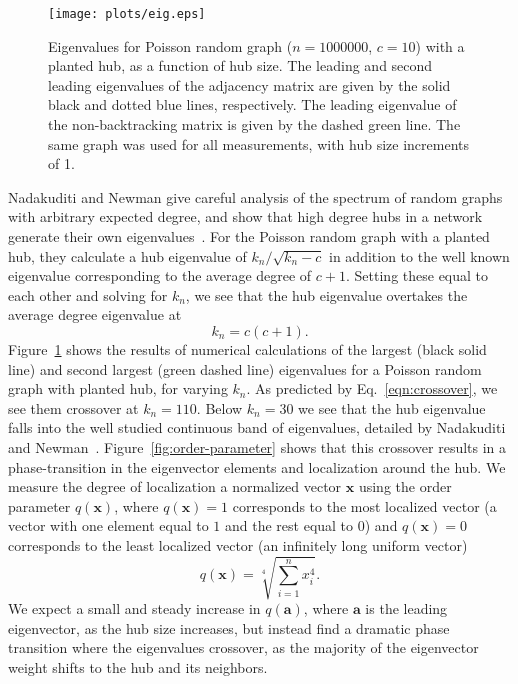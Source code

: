 \documentclass[twocolumn,prl,superscriptaddress]{revtex4}
\renewcommand{\vec}{\mathbf}
\newcommand\colora{black }
\newcommand\colorb{green }
\newcommand\colorc{blue }
\begin{document}
\begin{figure}
\begin{center}
\texttt{[image: plots/eig.eps]}
\end{center}
\caption{Eigenvalues for Poisson random graph ($n=1000000$, $c=10$) with a planted hub, as a function of hub size. The leading and second leading eigenvalues of the adjacency matrix are given by the solid \colora and dotted \colorc lines, respectively. The leading eigenvalue of the non-backtracking matrix is given by the dashed \colorb line. The same graph was used for all measurements, with hub size increments of 1.}
\label{fig:evalues}
\end{figure}
Nadakuditi and Newman give careful analysis of the spectrum of random graphs with arbitrary expected degree, and show that high degree hubs in a network generate their own eigenvalues~\cite{nadakuditi13}. For the Poisson random graph with a planted hub, they calculate a hub eigenvalue of $k_n / \sqrt{k_n - c}$ in addition to the well known eigenvalue corresponding to the average degree of $c+1$. Setting these equal to each other and solving for $k_n$, we see that the hub eigenvalue overtakes the average degree eigenvalue at
\begin{equation}
k_n = c(c+1).
\label{eqn:crossover}
\end{equation}
Figure~\ref{fig:evalues} shows the results of numerical calculations of the largest (\colora solid line) and second largest (green dashed line) eigenvalues for a Poisson random graph with planted hub, for varying $k_n$. As predicted by Eq.~\eqref{eqn:crossover}, we see them crossover at $k_n = 110$.
Below $k_n = 30$ we see that the hub eigenvalue falls into the well studied continuous band of eigenvalues, detailed by Nadakuditi and Newman~\cite{nadakuditi13}. Figure~\ref{fig:order-parameter} shows that this crossover results in a phase-transition in the eigenvector elements and localization around the hub. We measure the degree of localization a normalized vector $\vec{x}$ using the order parameter $q(\vec{x})$, where $q(\vec{x}) = 1$ corresponds to the most localized vector (a vector with one element equal to $1$ and the rest equal to $0$) and $q(\vec{x}) = 0$ corresponds to the least localized vector (an infinitely long uniform vector)
\begin{equation}
q(\vec{x}) = \sqrt[4]{\sum_{i=1}^n x_i ^ 4}.
\label{eqn:op}
\end{equation}
We expect a small and steady increase in $q(\vec{a})$, where $\vec{a}$ is the leading eigenvector, as the hub size increases, but instead find a dramatic phase transition where the eigenvalues crossover, as the majority of the eigenvector weight shifts to the hub and its neighbors.
\end{document}
